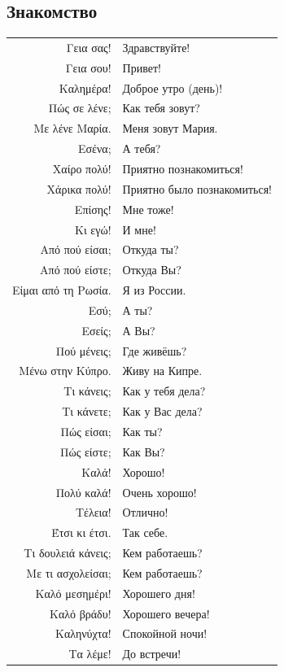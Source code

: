 \documentclass[12pt]{article}
\newcommand{\my}[1]{\textcolor{gray!80!white}{#1}}
\newenvironment{page}{\clearpage\normalsize\null\vfill}{\vfill\null}
\begin{document}
    	\begin{page}
    	\subsection{Знакомство}
    	\scriptsize
    	\begin{tabular}{rl}%
    		Γεια σας! & \my{Здравствуйте!}\\
    		Γεια σου! & \my{Привет!}\\
    		Καλημέρα! & \my{Доброе утро (день)!}\\
    		[2mm]
    		Πώς σε λένε; & \my{Как тебя зовут?}\\
    		Με λένε Μαρία. & \my{Меня зовут Мария.}\\
    		Εσένα; & \my{А тебя?}\\
    		Χαίρο πολύ! & \my{Приятно познакомиться!}\\
    		Χάρικα πολύ! & \my{Приятно было познакомиться!}\\
    		Επίσης! & \my{Мне тоже!}\\
    		Κι εγώ! & \my{И мне!}\\
    		[2mm]
    		Από πού είσαι; & \my{Откуда ты?}\\
    		Από πού είστε; & \my{Откуда Вы?}\\
    		Είμαι από τη Ρωσία. & \my{Я из России.}\\
    		Εσύ; & \my{А ты?}\\
    		Εσείς; & \my{А Вы?}\\
    		Πού μένεις; & \my{Где живёшь?}\\
    		Μένω στην Κύπρο. & \my{Живу на Кипре.}\\
    		[2mm]
    		Τι κάνεις; & \my{Как у тебя дела?}\\
    		Τι κάνετε; & \my{Как у Вас дела?}\\
    		Πώς είσαι; & \my{Как ты?}\\
    		Πώς είστε; & \my{Как Вы?}\\
    		Καλά! & \my{Хорошо!}\\
    		Πολύ καλά! & \my{Очень хорошо!}\\
    		Τέλεια! & \my{Отлично!}\\
    		Έτσι κι έτσι. & \my{Так себе.}\\
    		[2mm]
    		Τι δουλειά κάνεις; & \my{Кем работаешь?}\\
    		Με τι ασχολείσαι; & \my{Кем работаешь?}\\
    		[2mm]
    		Καλό μεσημέρι! & \my{Хорошего дня!}\\
    		Καλό βράδυ! & \my{Хорошего вечера!}\\
    		Καληνύχτα! & \my{Спокойной ночи!}\\
    		Τα λέμε! & \my{До встречи!}
    	\end{tabular}
    \end{page}
    
\end{document}
